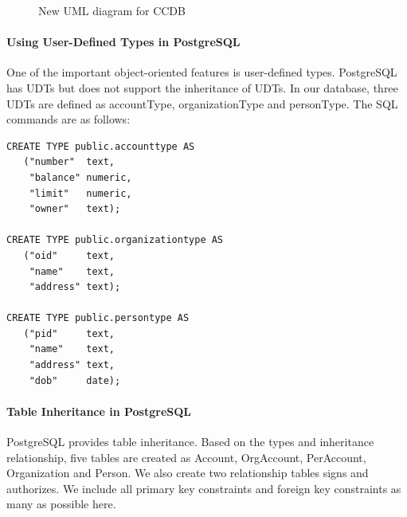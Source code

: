 \documentclass[11pt]{article}
\begin{document}
\begin{figure}[!htp]
\caption{New UML diagram for CCDB}
\label{fig:newumlccdb}
\end{figure}


\paragraph{Using User-Defined Types in PostgreSQL}

\par
One of the important object-oriented features is user-defined types. PostgreSQL has UDTs but does not support the inheritance of UDTs. In our database, three UDTs are defined as accountType, organizationType and personType. The SQL commands are as follows:

\begin{verbatim}
CREATE TYPE public.accounttype AS
   ("number"  text,
    "balance" numeric,
    "limit"   numeric,
    "owner"   text);

CREATE TYPE public.organizationtype AS
   ("oid"     text,
    "name"    text,
    "address" text);

CREATE TYPE public.persontype AS
   ("pid"     text,
    "name"    text,
    "address" text,
    "dob"     date);
\end{verbatim}

\paragraph{Table Inheritance in PostgreSQL}
\par
PostgreSQL provides table inheritance. Based on the types and inheritance relationship, five tables are created as Account, OrgAccount, PerAccount, Organization and Person. We also create two relationship tables signs and authorizes. We include all primary key constraints and foreign key constraints as many as possible here.
\end{document}
